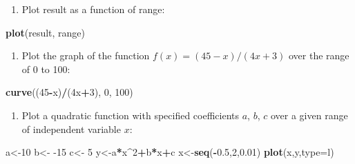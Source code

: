 \documentclass[
]{book}
\newenvironment{Shaded}{\begin{snugshade}}{\end{snugshade}}
\newcommand{\DataTypeTok}[1]{\textcolor[rgb]{0.13,0.29,0.53}{#1}}
\newcommand{\DecValTok}[1]{\textcolor[rgb]{0.00,0.00,0.81}{#1}}
\newcommand{\FloatTok}[1]{\textcolor[rgb]{0.00,0.00,0.81}{#1}}
\newcommand{\KeywordTok}[1]{\textcolor[rgb]{0.13,0.29,0.53}{\textbf{#1}}}
\newcommand{\NormalTok}[1]{#1}
\newcommand{\OperatorTok}[1]{\textcolor[rgb]{0.81,0.36,0.00}{\textbf{#1}}}
\newcommand{\StringTok}[1]{\textcolor[rgb]{0.31,0.60,0.02}{#1}}
\providecommand{\tightlist}{%
  \setlength{\itemsep}{0pt}\setlength{\parskip}{0pt}}
\begin{document}
\begin{enumerate}
\def\labelenumi{\arabic{enumi}.}
\setcounter{enumi}{2}
\tightlist
\item
  Plot result as a function of range:
\end{enumerate}

\begin{Shaded}
\begin{Highlighting}[]
\KeywordTok{plot}\NormalTok{(result, range)}
\end{Highlighting}
\end{Shaded}

\begin{enumerate}
\def\labelenumi{\arabic{enumi}.}
\setcounter{enumi}{3}
\tightlist
\item
  Plot the graph of the function \(f(x) = (45-x)/(4x+3)\) over the range of 0 to 100:
\end{enumerate}

\begin{Shaded}
\begin{Highlighting}[]
\KeywordTok{curve}\NormalTok{((}\DecValTok{45}\OperatorTok{{-}}\NormalTok{x)}\OperatorTok{/}\NormalTok{(4x}\OperatorTok{+}\DecValTok{3}\NormalTok{), }\DecValTok{0}\NormalTok{, }\DecValTok{100}\NormalTok{)}
\end{Highlighting}
\end{Shaded}

\begin{enumerate}
\def\labelenumi{\arabic{enumi}.}
\setcounter{enumi}{4}
\tightlist
\item
  Plot a quadratic function with specified coefficients \(a\), \(b\), \(c\) over a given range of independent variable \(x\):
\end{enumerate}

\begin{Shaded}
\begin{Highlighting}[]
\NormalTok{a\textless{}{-}}\DecValTok{10}
\NormalTok{b\textless{}{-}}\StringTok{ }\DecValTok{{-}15}
\NormalTok{c\textless{}{-}}\StringTok{ }\DecValTok{5}
\NormalTok{y\textless{}{-}a}\OperatorTok{*}\NormalTok{x}\OperatorTok{\^{}}\DecValTok{2}\OperatorTok{+}\NormalTok{b}\OperatorTok{*}\NormalTok{x}\OperatorTok{+}\NormalTok{c}
\NormalTok{x\textless{}{-}}\KeywordTok{seq}\NormalTok{(}\OperatorTok{{-}}\FloatTok{0.5}\NormalTok{,}\DecValTok{2}\NormalTok{,}\FloatTok{0.01}\NormalTok{) }
\KeywordTok{plot}\NormalTok{(x,y,}\DataTypeTok{type=}\StringTok{\textquotesingle{}l\textquotesingle{}}\NormalTok{)}
\end{Highlighting}
\end{Shaded}
\end{document}
